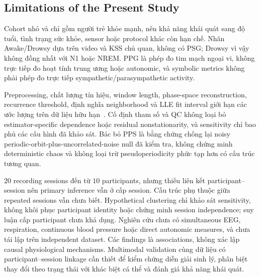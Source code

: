 \subsection{Limitations of the Present Study}

Cohort nhỏ và chỉ gồm người trẻ khỏe mạnh, nên khả năng khái quát sang độ tuổi, tình trạng sức khỏe, sensor hoặc protocol khác còn hạn chế. Nhãn Awake/Drowsy dựa trên video và KSS chủ quan, không có PSG; Drowsy vì vậy không đồng nhất với N1 hoặc NREM. PPG là phép đo tim mạch ngoại vi, không trực tiếp đo hoạt tính trung ương hoặc autonomic, và symbolic metrics không phải phép đo trực tiếp sympathetic/parasympathetic activity.

Preprocessing, chất lượng tín hiệu, window length, phase-space reconstruction, recurrence threshold, định nghĩa neighborhood và LLE fit interval giới hạn các ước lượng trên dữ liệu hữu hạn~\cite{martingonzalez2018,sviridova2022,yeragani2004,hu2009}. Cố định tham số và QC không loại bỏ estimator-specific dependence hoặc residual nonstationarity, và sensitivity chỉ bao phủ các cấu hình đã khảo sát. Bác bỏ PPS là bằng chứng chống lại noisy periodic-orbit-plus-uncorrelated-noise null đã kiểm tra, không chứng minh deterministic chaos và không loại trừ pseudoperiodicity phức tạp hơn có cấu trúc tương quan.

$20$ recording sessions đến từ $10$ participants, nhưng thiếu liên kết participant--session nên primary inference vẫn ở cấp session. Cấu trúc phụ thuộc giữa repeated sessions vẫn chưa biết. Hypothetical clustering chỉ khảo sát sensitivity, không khôi phục participant identity hoặc chứng minh session independence; suy luận cấp participant chưa khả dụng. Nghiên cứu chưa có simultaneous EEG, respiration, continuous blood pressure hoặc direct autonomic measures, và chưa tái lập trên independent dataset. Các findings là associations, không xác lập causal physiological mechanisms. Multimodal validation cùng dữ liệu có participant--session linkage cần thiết để kiểm chứng diễn giải sinh lý, phân biệt thay đổi theo trạng thái với khác biệt cá thể và đánh giá khả năng khái quát.